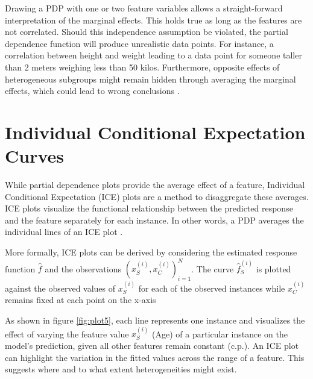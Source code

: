 \documentclass[]{krantz}
\begin{document}
Drawing a PDP with one or two feature variables allows a
straight-forward interpretation of the marginal effects. This holds true
as long as the features are not correlated. Should this independence
assumption be violated, the partial dependence function will produce
unrealistic data points. For instance, a correlation between height and
weight leading to a data point for someone taller than 2 meters weighing
less than 50 kilos. Furthermore, opposite effects of heterogeneous
subgroups might remain hidden through averaging the marginal effects,
which could lead to wrong conclusions \citep{molnar2019}.

\section{Individual Conditional Expectation
Curves}\label{individual-conditional-expectation-curves}

While partial dependence plots provide the average effect of a feature,
Individual Conditional Expectation (ICE) plots are a method to
disaggregate these averages. ICE plots visualize the functional
relationship between the predicted response and the feature separately
for each instance. In other words, a PDP averages the individual lines
of an ICE plot \citep{molnar2019}.

More formally, ICE plots can be derived by considering the estimated
response function \(\hat{f}\) and the observations
\({(x^{(i)}_S, x^{(i)}_C)}^N_{i=1}\). The curve \(\hat{f}_S^{(i)}\) is
plotted against the observed values of \(x^{(i)}_S\) for each of the
observed instances while \(x^{(i)}_C\) remains fixed at each point on
the x-axis \citep{molnar2019, Goldstein2013}

As shown in figure \ref{fig:plot5}, each line represents one instance
and visualizes the effect of varying the feature value \(x^{(i)}_S\)
(Age) of a particular instance on the model's prediction, given all
other features remain constant (c.p.). An ICE plot can highlight the
variation in the fitted values across the range of a feature. This
suggests where and to what extent heterogeneities might exist.
\end{document}
